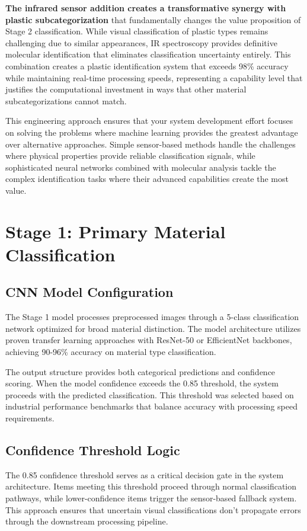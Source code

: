\documentclass[11pt, a4paper]{article}
\begin{document}
\textbf{The infrared sensor addition creates a transformative synergy with plastic subcategorization} that fundamentally changes the value proposition of Stage 2 classification. While visual classification of plastic types remains challenging due to similar appearances, IR spectroscopy provides definitive molecular identification that eliminates classification uncertainty entirely. This combination creates a plastic identification system that exceeds 98\% accuracy while maintaining real-time processing speeds, representing a capability level that justifies the computational investment in ways that other material subcategorizations cannot match.

This engineering approach ensures that your system development effort focuses on solving the problems where machine learning provides the greatest advantage over alternative approaches. Simple sensor-based methods handle the challenges where physical properties provide reliable classification signals, while sophisticated neural networks combined with molecular analysis tackle the complex identification tasks where their advanced capabilities create the most value.

\section{Stage 1: Primary Material Classification}

\subsection{CNN Model Configuration}
The Stage 1 model processes preprocessed images through a 5-class classification network optimized for broad material distinction. The model architecture utilizes proven transfer learning approaches with ResNet-50 or EfficientNet backbones, achieving 90-96\% accuracy on material type classification.

The output structure provides both categorical predictions and confidence scoring. When the model confidence exceeds the 0.85 threshold, the system proceeds with the predicted classification. This threshold was selected based on industrial performance benchmarks that balance accuracy with processing speed requirements.

\subsection{Confidence Threshold Logic}
The 0.85 confidence threshold serves as a critical decision gate in the system architecture. Items meeting this threshold proceed through normal classification pathways, while lower-confidence items trigger the sensor-based fallback system. This approach ensures that uncertain visual classifications don't propagate errors through the downstream processing pipeline.
\end{document}
